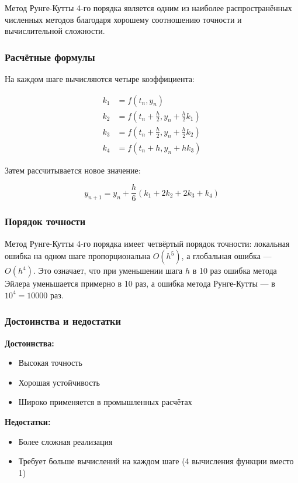\documentclass[a4paper,12pt]{article}
\begin{document}
Метод Рунге-Кутты 4-го порядка является одним из наиболее распространённых численных методов благодаря хорошему соотношению точности и вычислительной сложности.

\subsubsection{Расчётные формулы}
На каждом шаге вычисляются четыре коэффициента:

\begin{equation}
    \begin{aligned}
    k_1 &= f(t_n, y_n) \\
    k_2 &= f\left(t_n + \frac{h}{2}, y_n + \frac{h}{2}k_1\right) \\
    k_3 &= f\left(t_n + \frac{h}{2}, y_n + \frac{h}{2}k_2\right) \\
    k_4 &= f(t_n + h, y_n + h k_3)
    \end{aligned} \label{eq:rungekutta_coefs}
\end{equation}

Затем рассчитывается новое значение:

\begin{equation}
    y_{n+1} = y_n + \frac{h}{6}(k_1 + 2k_2 + 2k_3 + k_4) \label{eq:rungekutta}
\end{equation}

\subsubsection{Порядок точности}
Метод Рунге-Кутты 4-го порядка имеет четвёртый порядок точности: локальная ошибка на одном шаге пропорциональна \(O(h^5)\), а глобальная ошибка — \(O(h^4)\). Это означает, что при уменьшении шага \(h\) в 10 раз ошибка метода Эйлера уменьшается примерно в 10 раз, а ошибка метода Рунге-Кутты — в \(10^4 = 10000\) раз.

\subsubsection{Достоинства и недостатки}
\textbf{Достоинства:}
\begin{itemize}
    \item Высокая точность
    \item Хорошая устойчивость
    \item Широко применяется в промышленных расчётах
\end{itemize}

\textbf{Недостатки:}
\begin{itemize}
    \item Более сложная реализация
    \item Требует больше вычислений на каждом шаге (4 вычисления функции вместо 1)
\end{itemize}
\end{document}
